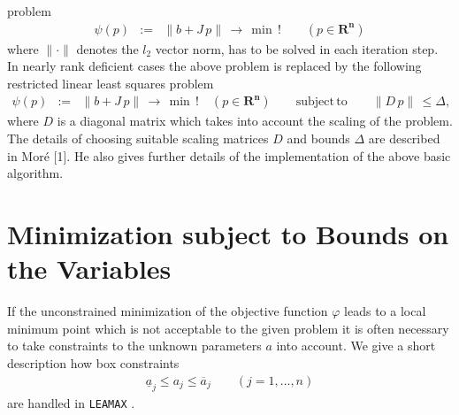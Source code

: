 problem
\begin{eqnarray*}
\psi (p) & := & \parallel b+J\,p \parallel\,\to\, \min \,!
\qquad (p \in \mathbf{R^n})
\end{eqnarray*}
where $\parallel \cdot \parallel$ denotes the $l_2$ vector norm,
has to be solved in each iteration step.
In nearly rank deficient cases the above problem is replaced by the
following restricted linear least squares problem
\begin{eqnarray*}
\psi(p) & := & \parallel b+J\,p \parallel\, \to\, \min\,! \quad
(p \in \mathbf{R^n})  \qquad \mathrm{subject}\,\mathrm{to} \qquad
\parallel D \, p \parallel \,\leq \Delta,
\end{eqnarray*}
where $D$ is a diagonal matrix which takes into account the
scaling of the problem. The details of choosing suitable scaling matrices
$D$ and bounds $\Delta$ are described in Mor\'e [1]. He also gives
further details of the implementation of the above basic algorithm.

\newpage
\section{Minimization subject to Bounds on the Variables}

If the unconstrained minimization of the objective function $\varphi$
leads to a local minimum point which is not acceptable to the given
problem it is often necessary to take constraints to the unknown
parameters $a$ into account.
We give a short description how box constraints
\begin{eqnarray*}
\underline{a}_j \le a_j \le \overline{a}_j \qquad (j=1,\ldots,n)
\end{eqnarray*}
are handled in {\tt LEAMAX} .
 
